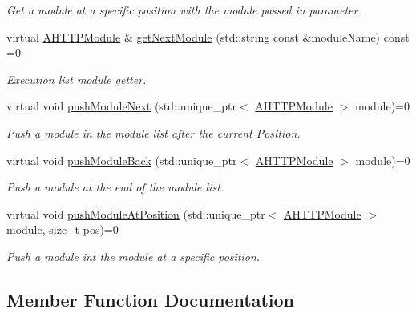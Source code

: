 \begin{DoxyCompactItemize}
\begin{DoxyCompactList}\small\item\em Get a module at a specific position with the module passed in parameter. \end{DoxyCompactList}\item 
virtual \mbox{\hyperlink{classxzia_1_1AHTTPModule}{A\+H\+T\+T\+P\+Module}} \& \mbox{\hyperlink{classxzia_1_1ITask_aa9134b2c523aa55d5f9cfe12866ed508}{get\+Next\+Module}} (std\+::string const \&module\+Name) const =0
\begin{DoxyCompactList}\small\item\em Execution list module getter. \end{DoxyCompactList}\item 
virtual void \mbox{\hyperlink{classxzia_1_1ITask_a0df4e8d2b1391fe1aa7e7bed7d35175e}{push\+Module\+Next}} (std\+::unique\+\_\+ptr$<$ \mbox{\hyperlink{classxzia_1_1AHTTPModule}{A\+H\+T\+T\+P\+Module}} $>$ module)=0
\begin{DoxyCompactList}\small\item\em Push a module in the module list after the current Position. \end{DoxyCompactList}\item 
virtual void \mbox{\hyperlink{classxzia_1_1ITask_a4a742a320f905285dc8fa4510090c381}{push\+Module\+Back}} (std\+::unique\+\_\+ptr$<$ \mbox{\hyperlink{classxzia_1_1AHTTPModule}{A\+H\+T\+T\+P\+Module}} $>$ module)=0
\begin{DoxyCompactList}\small\item\em Push a module at the end of the module list. \end{DoxyCompactList}\item 
virtual void \mbox{\hyperlink{classxzia_1_1ITask_a10e224e38e770108abb3518c06156094}{push\+Module\+At\+Position}} (std\+::unique\+\_\+ptr$<$ \mbox{\hyperlink{classxzia_1_1AHTTPModule}{A\+H\+T\+T\+P\+Module}} $>$ module, size\+\_\+t pos)=0
\begin{DoxyCompactList}\small\item\em Push a module int the module at a specific position. \end{DoxyCompactList}\end{DoxyCompactItemize}


\subsection{Member Function Documentation}
\mbox{\label{classxzia_1_1ITask_a7368f69854dd9af5af668e036560226d}} 
